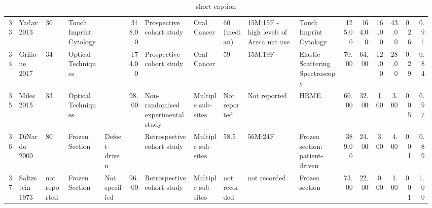 \begin{table}[ht]
\begin{tabular}{rllllrlllllrrrrrr}
  33 & Yadav 2013 & 30 & Touch Imprint Cytology &  & 348.00 & Prospective cohort study & Oral Cancer & 60 (median) & 15M:15F - high levels of Areca nut use & Touch Imprint Cytology & 125.00 & 164.00 & 16.00 & 43.00 & 0.26 & 0.91 \\ 
  34 & Grillone 2017 & 34 & Optical Techniques &  & 174.00 & Prospective cohort study & Oral Cancer & 59 & 15M:19F & Elastic Scattering Spectroscopy & 70.00 & 64.00 & 12.00 & 28.00 & 0.29 & 0.84 \\ 
  35 & Miles 2015 & 33 & Optical Techniques &  & 98.00 & Non-randomised experimental study & Multiple sub-sites & Not reported & Not reported & HRME & 60.00 & 32.00 & 1.00 & 3.00 & 0.05 & 0.97 \\ 
  36 & DiNardo 2000 & 80 & Frozen Section & Defect-driven &  & Retrospective cohort study & Multiple sub-sites & 58.5 & 56M:24F & Frozen section: patient-driven & 389.00 & 24.00 & 3.00 & 4.00 & 0.01 & 0.89 \\ 
  37 & Saltzstein 1973 & not reported & Frozen Section & Not specified & 96.00 & Retrospective cohort study & Multiple sub-sites & not recorded & not recorded & Frozen section & 73.00 & 22.00 & 0.00 & 1.00 & 0.01 & 1.00 \\ 
   \hline
\end{tabular}
\caption[full caption]{short caption} 
\label{tab:study_details}
\end{table}
